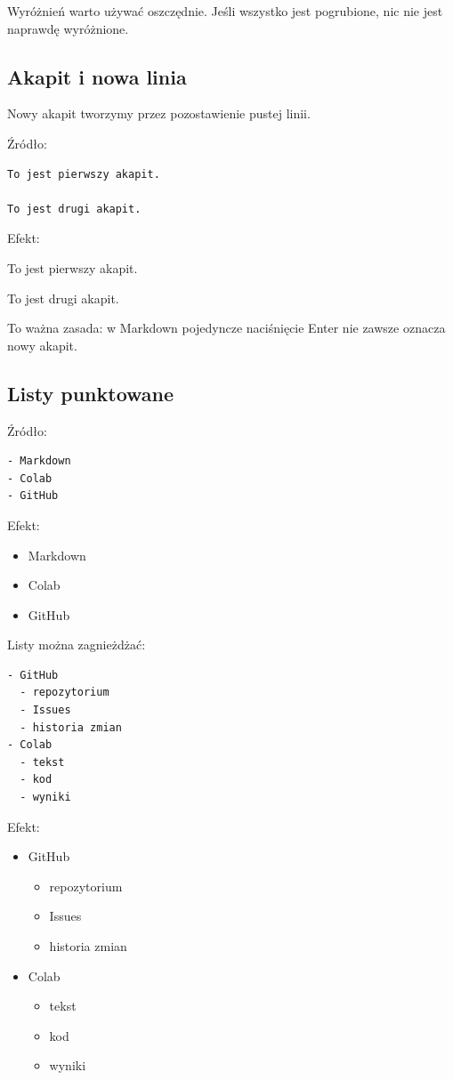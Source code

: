 \documentclass[12pt,a4paper]{article}
\begin{document}
Wyróżnień warto używać oszczędnie. Jeśli wszystko jest pogrubione, nic nie jest naprawdę wyróżnione.

\subsection{Akapit i nowa linia}

Nowy akapit tworzymy przez pozostawienie pustej linii.

Źródło:

\begin{lstlisting}
To jest pierwszy akapit.

To jest drugi akapit.
\end{lstlisting}

Efekt:

To jest pierwszy akapit.

To jest drugi akapit.

To ważna zasada: w Markdown pojedyncze naciśnięcie Enter nie zawsze oznacza nowy akapit.

\subsection{Listy punktowane}

Źródło:

\begin{lstlisting}
- Markdown
- Colab
- GitHub
\end{lstlisting}

Efekt:

\begin{itemize}
    \item Markdown
    \item Colab
    \item GitHub
\end{itemize}

Listy można zagnieżdżać:

\begin{lstlisting}
- GitHub
  - repozytorium
  - Issues
  - historia zmian
- Colab
  - tekst
  - kod
  - wyniki
\end{lstlisting}

Efekt:

\begin{itemize}
    \item GitHub
    \begin{itemize}
        \item repozytorium
        \item Issues
        \item historia zmian
    \end{itemize}
    \item Colab
    \begin{itemize}
        \item tekst
        \item kod
        \item wyniki
    \end{itemize}
\end{itemize}
\end{document}
